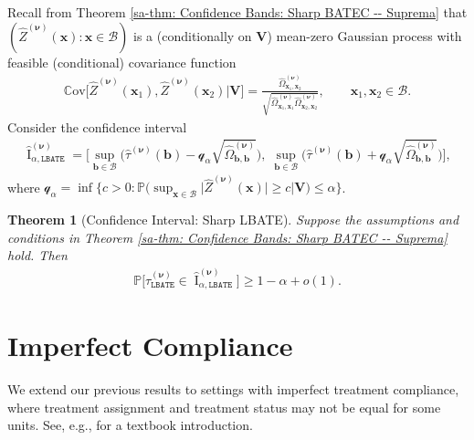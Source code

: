 \documentclass[10pt]{article}
\newtheorem{thm}{Theorem}
\DeclareMathOperator{\CI}{I}
\renewcommand{\P}{\mathbb{P}}
\newcommand{\Cov}{\mathbb{C}\mathrm{ov}}
\newcommand{\bb}{\mathbf{b}}
\newcommand{\bV}{\mathbf{V}}
\newcommand{\bx}{\mathbf{x}}
\newcommand{\bnu}{\boldsymbol{\nu}}
\newcommand{\B}{\mathcal{B}}
\newcommand{\q}{\mathcal{q}}
\begin{document}
Recall from Theorem \ref{sa-thm: Confidence Bands: Sharp BATEC -- Suprema} that $(\widehat{Z}^{(\bnu)}(\bx):\bx \in \B)$ is a (conditionally on $\bV$) mean-zero Gaussian process with feasible (conditional) covariance function
\begin{align*}
    \Cov \Big[\widehat{Z}^{(\bnu)}(\bx_1),\widehat{Z}^{(\bnu)}(\bx_2) \Big|\bV \Big]
    = \frac{\widehat{\Omega}_{\bx_1,\bx_2}^{(\bnu)}}
           {\sqrt{\widehat{\Omega}_{\bx_1,\bx_1}^{(\bnu)} \widehat{\Omega}_{\bx_2,\bx_2}^{(\bnu)}}},
    \qquad \bx_1, \bx_2 \in \B.
\end{align*}
Consider the confidence interval
\begin{align*}
    \widehat{\CI}_{\alpha,\mathtt{LBATE}}^{(\bnu)} = \bigg[\sup_{\bb \in \B} \Big(\widehat{\tau}^{(\bnu)}(\bb)  - \q_{\alpha} \sqrt{\widehat{\Omega}_{\bb,\bb}^{(\bnu)}}\Big), \; \sup_{\bb \in \B} \Big(\widehat{\tau}^{(\bnu)}(\bb) + \q_{\alpha} \sqrt{\widehat{\Omega}_{\bb,\bb}^{(\bnu)}}\Big)\bigg],
\end{align*}
where $\q_{\alpha} = \inf \big\{c > 0: \P \big(\sup_{\bx \in \B} \big|\widehat{Z}^{(\bnu)}(\bx)\big|\geq c \big| \bV \big) \leq \alpha \big\}$.

\begin{thm}[Confidence Interval: Sharp LBATE]\label{sa-thm: Confidence Intervals: Sharp LBATE}
    Suppose the assumptions and conditions in Theorem \ref{sa-thm: Confidence Bands: Sharp BATEC -- Suprema} hold. Then
    \begin{align*}
            \P\Big[\tau_{\mathtt{LBATE}}^{(\bnu)} \in \widehat{\CI}_{\alpha,\mathtt{LBATE}}^{(\bnu)} \Big] \geq 1 - \alpha + o(1).
    \end{align*}
\end{thm}


\section{Imperfect Compliance}\label{sa-sec: Imperfect Compliance}

We extend our previous results to settings with imperfect treatment compliance, where treatment assignment and treatment status may not be equal for some units. See, e.g., \cite{Hernan-Robins_2020_Book} for a textbook introduction.
\end{document}
